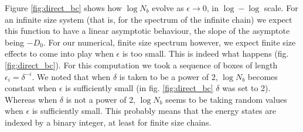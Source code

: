 \documentclass[11pt]{article}
\begin{document}
Figure \eqref{fig:direct_bc} shows how $\log N_b$ evolve as $\epsilon \rightarrow 0$, in $\log-\log$ scale. 
For an infinite size system (that is, for the spectrum of the infinite chain) we expect this function to have a linear asymptotic behaviour, the slope of the asymptote being $-D_0$.
For our numerical, finite size spectrum however, we expect finite size effects to come into play when $\epsilon$ is too small.
This is indeed what happens (fig. \eqref{fig:direct_bc}). For this computation we took a sequence of boxes of length $\epsilon_i = \delta^{-i}$. We noted that when $\delta$ is taken to be a power of 2, $\log N_b$ becomes constant when $\epsilon$ is sufficiently small (in fig. \eqref{fig:direct_bc} $\delta$ was set to 2). Whereas when $\delta$ is not a power of 2, $\log N_b$ seems to be taking random values when $\epsilon$ is sufficiently small. 
This probably means that the energy states are indexed by a binary integer, at least for finite size chains.

{}

\end{document}
